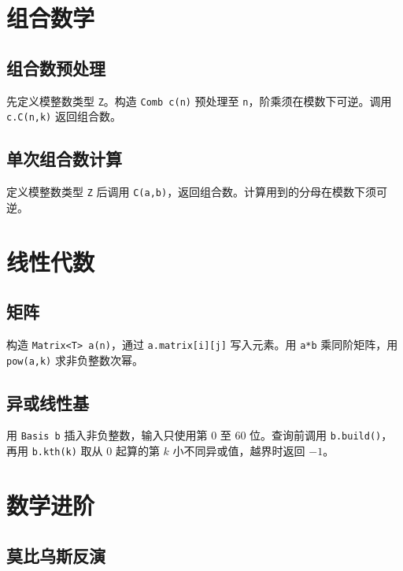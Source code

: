 \section{组合数学}

\subsection{组合数预处理}

先定义模整数类型 \texttt{Z}。构造 \texttt{Comb c(n)} 预处理至 \texttt{n}，阶乘须在模数下可逆。调用 \texttt{c.C(n,k)} 返回组合数。


\subsection{单次组合数计算}

定义模整数类型 \texttt{Z} 后调用 \texttt{C(a,b)}，返回组合数。计算用到的分母在模数下须可逆。


\section{线性代数}

\subsection{矩阵}

构造 \texttt{Matrix<T> a(n)}，通过 \texttt{a.matrix[i][j]} 写入元素。用 \texttt{a*b} 乘同阶矩阵，用 \texttt{pow(a,k)} 求非负整数次幂。


\subsection{异或线性基}

用 \texttt{Basis b} 插入非负整数，输入只使用第 $0$ 至 $60$ 位。查询前调用 \texttt{b.build()}，再用 \texttt{b.kth(k)} 取从 $0$ 起算的第 $k$ 小不同异或值，越界时返回 $-1$。


\section{数学进阶}

\subsection{莫比乌斯反演}

